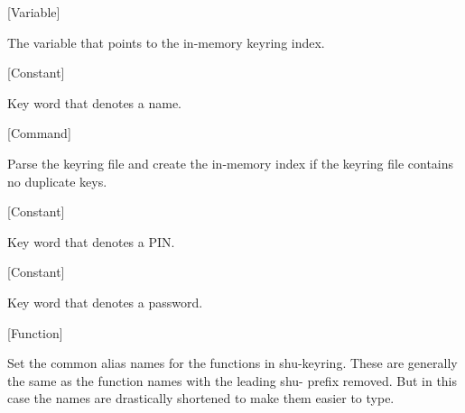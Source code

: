 \vspace{1em}
\noindent
{}
\usebox{\funcname}
 \hfill [Variable]

\begin{doc-string}
The variable that points to the in-memory keyring index.
\end{doc-string}

\vspace{1em}
\noindent
{}
\usebox{\funcname}
 \hfill [Constant]

\begin{doc-string}
Key word that denotes a name.
\end{doc-string}

\vspace{1em}
\noindent
{}
\usebox{\funcname}
 \hfill [Command]

\begin{doc-string}
Parse the keyring file and create the in-memory index if the keyring file
contains no duplicate keys.
\end{doc-string}

\vspace{1em}
\noindent
{}
\usebox{\funcname}
 \hfill [Constant]

\begin{doc-string}
Key word that denotes a PIN.
\end{doc-string}

\vspace{1em}
\noindent
{}
\usebox{\funcname}
 \hfill [Constant]

\begin{doc-string}
Key word that denotes a password.
\end{doc-string}

\vspace{1em}
\noindent
{}
\usebox{\funcname}
 \hfill [Function]

\begin{doc-string}
Set the common alias names for the functions in shu-keyring.
These are generally the same as the function names with the leading
shu- prefix removed.  But in this case the names are drastically shortened
to make them easier to type.
\end{doc-string}

